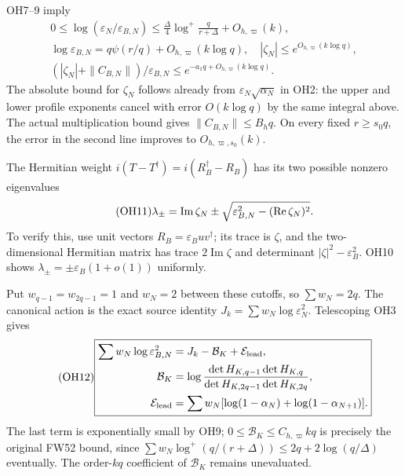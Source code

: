 \documentclass[11pt]{article}
\newcommand{\Ima}{\operatorname{Im}}\newcommand{\dd}{\,d}
\newcommand{\eps}{\varepsilon}
\begin{document}
OH7--9 imply
\begin{equation}\tag{OH10}\boxed{\begin{gathered}
 0\le\log(\eps_N/\eps_{B,N})
 \le\frac\Delta4\log^+\frac q{r+\Delta}+O_{h,\varpi}(k),\\
 \log\eps_{B,N}=q\psi(r/q)+O_{h,\varpi}(k\log q),\quad
 |\zeta_N|\le e^{O_{h,\varpi}(k\log q)},\\
 (|\zeta_N|+\|C_{B,N}\|)/\eps_{B,N}
 \le e^{-a_1q+O_{h,\varpi}(k\log q)}.
\end{gathered}}\end{equation}
The absolute bound for $\zeta_N$ follows already from
$\eps_N\sqrt{\alpha_N}$ in OH2: the upper and lower profile
exponents cancel with error $O(k\log q)$ by the same integral above.
The actual multiplication bound gives $\|C_{B,N}\|\le B_hq$.
On every fixed $r\ge s_0q$, the error in the second line improves to
$O_{h,\varpi,s_0}(k)$.

The Hermitian weight $i(T-T^\dagger)=i(R_B^\dagger-R_B)$ has its
two possible nonzero eigenvalues
\begin{equation}\tag{OH11}
 \lambda_\pm=\Ima\zeta_N\pm
           \sqrt{\eps_{B,N}^2-(\Rea\zeta_N)^2}.
\end{equation}
To verify this, use unit vectors $R_B=\eps_Buv^\dagger$; its trace
is $\zeta$, and the two-dimensional Hermitian matrix has trace
$2\Ima\zeta$ and determinant $|\zeta|^2-\eps_B^2$. OH10 shows
$\lambda_\pm=\pm\eps_B(1+o(1))$ uniformly.

Put $w_{q-1}=w_{2q-1}=1$ and $w_N=2$ between these cutoffs, so
$\sum w_N=2q$. The canonical action is the exact source identity
$J_k=\sum w_N\log\eps_N^2$. Telescoping OH3 gives
\begin{equation}\tag{OH12}\boxed{\begin{aligned}
 \sum w_N\log\eps_{B,N}^2
 &=J_k-\mathcal B_K+\mathcal E_{\rm lead},\\
 \mathcal B_K&=\log\frac{\det H_{K,q-1}\det H_{K,q}}
                           {\det H_{K,2q-1}\det H_{K,2q}},\\
 \mathcal E_{\rm lead}&=\sum w_N[\log(1-\alpha_N)
                                      +\log(1-\alpha_{N+1})].
\end{aligned}}\end{equation}
The last term is exponentially small by OH9; $0\le\mathcal B_K\le
C_{h,\varpi}kq$ is precisely the original FW52 bound, since
$\sum w_N\log^+(q/(r+\Delta))\le2q+2\log(q/\Delta)$ eventually.
The order-$kq$ coefficient of $\mathcal B_K$ remains unevaluated.
\end{document}
